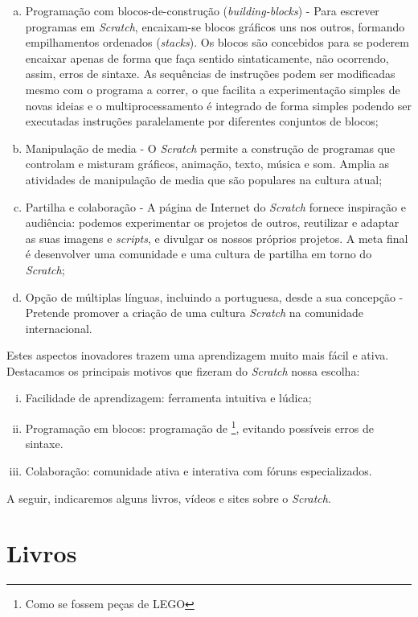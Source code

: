 \documentclass[12pt,fleqn]{book} %
\begin{document}
\begin{enumerate}[a)]
	\item Programação com blocos-de-construção (\textit{building-blocks}) - Para escrever programas em \textit{Scratch}, encaixam-se blocos gráficos uns nos outros, formando empilhamentos ordenados (\textit{stacks}). Os blocos são concebidos para se poderem encaixar apenas de forma que faça sentido sintaticamente, não ocorrendo, assim, erros de sintaxe. As sequências de instruções podem ser modificadas mesmo com o programa a correr, o que facilita a experimentação simples de novas ideias e o multiprocessamento é integrado de forma simples podendo ser executadas instruções paralelamente por diferentes conjuntos de blocos;
	\item Manipulação de media - O \textit{Scratch} permite a construção de programas que controlam e misturam gráficos, animação, texto, música e som. Amplia as atividades de manipulação de media que são populares na cultura atual;
	\item Partilha e colaboração - A página de Internet do \textit{Scratch} fornece inspiração e audiência: podemos experimentar os projetos de outros, reutilizar e adaptar as suas imagens e \textit{scripts}, e divulgar os nossos próprios projetos. A meta final é desenvolver uma comunidade e uma cultura de partilha em torno do \textit{Scratch};
	\item Opção de múltiplas línguas, incluindo a portuguesa, desde a sua concepção - Pretende promover a criação de uma cultura \textit{Scratch} na comunidade internacional.	
\end{enumerate}

Estes aspectos inovadores trazem uma aprendizagem muito mais fácil e ativa. Destacamos os principais motivos que fizeram do \textit{Scratch} nossa escolha:

\begin{enumerate}[i)]
	\item Facilidade de aprendizagem: ferramenta intuitiva e lúdica; 
	\item Programação em blocos: programação de \footnote{Como se fossem peças de LEGO}, evitando possíveis erros de sintaxe.
	\item Colaboração: comunidade ativa e interativa com fóruns especializados. 
\end{enumerate}

A seguir, indicaremos alguns livros, vídeos e sites sobre o \textit{Scratch}.

\section{Livros}
\end{document}
